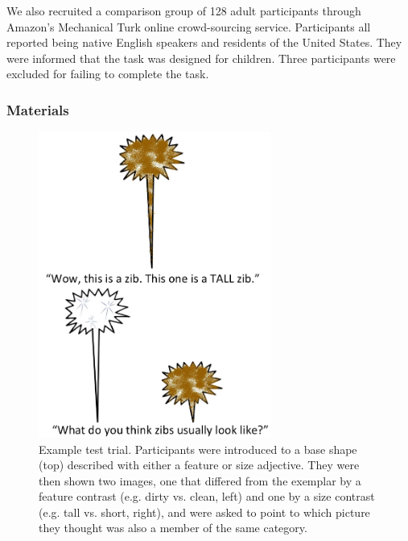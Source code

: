 \documentclass[man]{apa2}
\begin{document}
  

We also recruited a comparison group of 128 adult participants through Amazon's Mechanical Turk online crowd-sourcing service.  Participants all reported being native English speakers and residents of the United States. They were informed that the task was designed for children. Three participants were excluded for failing to complete the task.  

\subsubsection{Materials}

\begin{figure}[t]
  \begin{center} 
    \includegraphics[width=3in]{figures/zib_example.png} 
    \caption{\label{fig:inanimate_demo} Example test trial. Participants were introduced to a base shape (top) described with either a feature or size adjective. They were then shown two images, one that differed from the exemplar by a feature contrast (e.g. dirty vs. clean, left) and one by a size contrast (e.g. tall vs. short, right), and were asked to point to which picture they thought was also a member of the same category. } 
  \end{center} 
\end{figure}	
\end{document}
